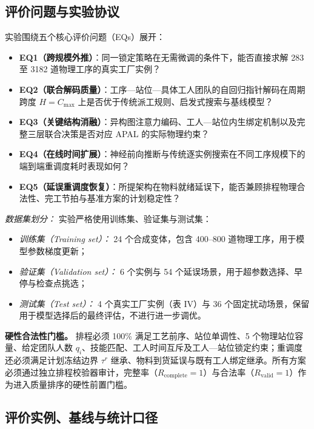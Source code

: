 \documentclass[journal,10pt]{IEEEtran}
\begin{document}
\subsection{评价问题与实验协议}\label{sec:exp_protocol}

实验围绕五个核心评价问题（EQs）展开：
\begin{itemize}
\item \textbf{EQ1（跨规模外推）}：同一锁定策略在无需微调的条件下，能否直接求解 283 至 3182 道物理工序的真实工厂实例？
\item \textbf{EQ2（联合解码质量）}：工序---站位---具体工人团队的自回归指针解码在周期跨度 $H=C_{\max}$ 上是否优于传统派工规则、启发式搜索与基线模型？
\item \textbf{EQ3（关键结构消融）}：异构图注意力编码、工人---站位内生绑定机制以及完整三层联合决策是否对应 APAL 的实际物理约束？
\item \textbf{EQ4（在线时间扩展）}：神经前向推断与传统逐实例搜索在不同工序规模下的端到端重调度耗时表现如何？
\item \textbf{EQ5（延误重调度恢复）}：所提架构在物料就绪延误下，能否兼顾排程物理合法性、完工节拍与基准方案的计划稳定性？
\end{itemize}

\textit{数据集划分：}
实验严格使用训练集、验证集与测试集：
\begin{itemize}
\item \textit{训练集（Training set）：} 24 个合成变体，包含 400--800 道物理工序，用于模型参数梯度更新；
\item \textit{验证集（Validation set）：} 6 个实例与 54 个延误场景，用于超参数选择、早停与检查点挑选；
\item \textit{测试集（Test set）：} 4 个真实工厂实例（表 IV）与 36 个固定扰动场景，保留用于模型选择后的最终评估，不进行进一步调优。
\end{itemize}

\textbf{硬性合法性门槛。} 排程必须 100\% 满足工艺前序、站位单调性、5 个物理站位容量、给定团队人数 $q_i$、技能匹配、工人时间互斥及工人---站位锁定约束；重调度还必须满足计划冻结边界 $\tau^r$ 继承、物料到货延误与既有工人绑定继承。所有方案必须通过独立排程校验器审计，完整率（$R_{\mathrm{complete}}=1$）与合法率（$R_{\mathrm{valid}}=1$）作为进入质量排序的硬性前置门槛。

\subsection{评价实例、基线与统计口径}\label{sec:instances}
\end{document}
